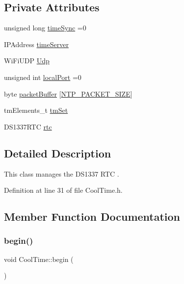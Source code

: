 \subsection*{Private Attributes}
\begin{DoxyCompactItemize}
\item 
unsigned long \hyperlink{class_cool_time_a9d032e76c3470a15b3bbbc52af6463f7}{time\+Sync} =0
\item 
I\+P\+Address \hyperlink{class_cool_time_ad2b9858f399108cb440dd1e908916f04}{time\+Server}
\item 
Wi\+Fi\+U\+DP \hyperlink{class_cool_time_a4e23216a8121ca79d0fb019f30884b92}{Udp}
\item 
unsigned int \hyperlink{class_cool_time_a2f777da44d7ba678be8185299e9b49d1}{local\+Port} =0
\item 
byte \hyperlink{class_cool_time_a27e6abc82a5c2f72161956967005bec7}{packet\+Buffer} \mbox{[}\hyperlink{_cool_time_8h_a56a6ea64006651b4f42adf713e244f06}{N\+T\+P\+\_\+\+P\+A\+C\+K\+E\+T\+\_\+\+S\+I\+ZE}\mbox{]}
\item 
tm\+Elements\+\_\+t \hyperlink{class_cool_time_ad33c2713c903ff064ad09c46406ae088}{tm\+Set}
\item 
D\+S1337\+R\+TC \hyperlink{class_cool_time_abd38f2384ff90692b1568d9db869412e}{rtc}
\end{DoxyCompactItemize}


\subsection{Detailed Description}
This class manages the D\+S1337 R\+TC . 

Definition at line 31 of file Cool\+Time.\+h.



\subsection{Member Function Documentation}
\mbox{\label{class_cool_time_ab1976cf718b950bc31e003c3323b8adb}} 
\subsubsection{\texorpdfstring{begin()}{begin()}}
{\footnotesize\ttfamily void Cool\+Time\+::begin (\begin{DoxyParamCaption}{ }\end{DoxyParamCaption})}

